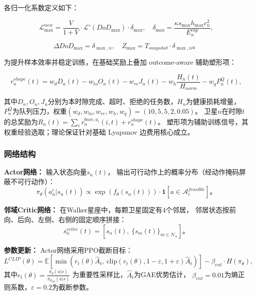 \documentclass[a4paper,11pt]{article}
\begin{document}
各归一化系数定义如下：

\begin{equation}
\mathcal{L}^{new}_{\max} = \frac{V}{1+V}\cdot
\mathcal{L}'(DoD_{\max})\cdot\delta_{\max},
\quad
\delta_{\max} = \frac{\kappa s_{\max} h_{\max} c^2_n}{E^{cap}_n},
\label{eq:norm1}
\end{equation}

\begin{equation}
\Delta DoD_{\max} = \delta_{\max,n},
\quad
Z_{\max} = T_{snapshot}\cdot\delta_{\max,n}。
\label{eq:norm2}
\end{equation}

为提升样本效率并稳定训练，在基础奖励上叠加 outcome-aware 辅助塑形项：

\begin{equation}
r^{shape}_n(t) = w_d D_n(t) - w_{to} O_n(t) - w_{re} J_n(t)
- w_h \frac{H_n(t)}{H_{norm}} - w_q P^{Q}_n(t),
\label{eq:reward_shape}
\end{equation}

其中$D_n, O_n, J_n$分别为本时隙完成、超时、拒绝的任务数，$H_n$为健康损耗增量，
$P^Q_n$为队列压力，权重$(w_d, w_{to}, w_{re}, w_h, w_q) = (10, 5, 5, 2, 0.05)$。
卫星$n$在时隙$t$的总奖励为$R_n(t) = \sum_i r^{base,a_i}_n(i,t) + r^{shape}_n(t)$。
塑形项为辅助训练信号，其权重经验选取；理论保证针对基础 Lyapunov 边费用核心成立。

\subsubsection{网络结构}

\textbf{Actor网络：}
输入状态向量$s_n(t)$，
输出可行动作上的概率分布（经动作掩码屏蔽不可行动作）：
\begin{equation}
\pi_\theta(a^i_n | s_n(t))
\propto \exp(f_\theta(s_n(t)))
\cdot \mathbf{1}[a \in \mathcal{A}^{feasible}_i]。
\label{eq:actor}
\end{equation}

\textbf{邻域Critic网络：}
在Walker星座中，每颗卫星固定有4个邻居，
邻居状态按前向、后向、左侧、右侧的固定顺序拼接：
\begin{equation}
s^{critic}_n(t) = [s_n(t),\
\{s_m(t)\}_{m \in \mathcal{N}_n}]。
\label{eq:critic_input}
\end{equation}

\textbf{参数更新：}
Actor网络采用PPO截断目标：
\begin{equation}
L^{CLIP}(\theta) = \mathbb{E}\left[
\min\left(r_t(\theta)\hat{A}_t,\
\text{clip}(r_t(\theta), 1-\varepsilon, 1+\varepsilon)\hat{A}_t
\right)
\right] - \beta_{ent}\cdot H(\pi_\theta),
\label{eq:ppo}
\end{equation}
其中$r_t(\theta) = \frac{\pi_\theta(a|s)}{\pi_{\theta_{old}}(a|s)}$
为重要性采样比，$\hat{A}_t$为GAE优势估计，
$\beta_{ent}=0.01$为熵正则系数，$\varepsilon=0.2$为截断参数。
\end{document}
